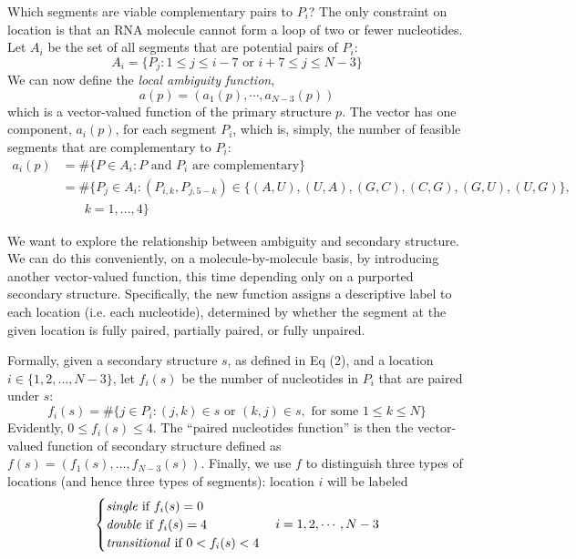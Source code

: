 \documentclass[10pt,letterpaper]{article}
\begin{document}
Which segments are viable complementary pairs to $P_i$? The only constraint on location is that an RNA molecule cannot form a loop of two or fewer nucleotides. Let $A_i$ be the set of all segments that are potential pairs of $P_i$:
\begin{equation}
A_i = \{P_j: 1 \leq j \leq i - 7 \text{ or }i + 7 \leq j \leq N - 3\}
\end{equation}
We can now define the {\em local ambiguity function}, 
\[
a(p) = (a_1(p), \cdots, a_{N - 3}(p))
\]
which is a vector-valued function of the primary structure $p$. The vector has  one component, $a_i(p)$, for each segment $P_i$, which is, simply, the number of feasible segments that are complementary to $P_i$:
\begin{align}
 a_i (p)& =  \# \{ P \in A_i : P \text{ and }P_i \text{ are complementary} \}  
 \label{eqn:LocalAmbiguity} \\
& = 
\#\big\{P_j\in A_i:  (P_{i, k}, P_{j, 5 - k}) \in \{ (A, U), (U, A), (G, C), (C, G), (G,U), (U,G) \},
\nonumber  \\
&  \ \ \ \ \ \ \ \ k=1,\ldots,4 \big\} 
\nonumber 
\end{align}

We want to explore the relationship between ambiguity and secondary structure. 
We can do this conveniently, on a molecule-by-molecule basis, by introducing another vector-valued function, this time depending only on a purported secondary structure.  Specifically, the new function assigns a descriptive label to each location (i.e. each nucleotide), determined by whether the segment at the given location is fully paired, partially paired, or fully unpaired. 

Formally, given a secondary structure $s$, as defined in Eq (2), and a location $i\in\{1, 2,\ldots,N-3\}$, let $f_i(s)$ be the number of nucleotides in $P_i$ that are paired under $s$:
\begin{equation}
f_i(s) = \#\{j\in P_i:(j,k)\in s\text{ or } (k,j)\in s, \text{ for some } 1\leq k \leq N\}
\end{equation}
Evidently, $0\leq f_i(s)\leq 4$. The ``paired nucleotides function'' is then the 
vector-valued function of secondary structure defined as 
$f(s)=(f_1(s),\ldots,f_{N-3}(s))$.
Finally, we use $f$ to distinguish three types of locations (and hence three types of segments): location $i$ will be labeled 
\begin{equation}
	\begin{cases}
		\text{\textit{single} if } f_i(s) = 0 \\
		\text{\textit{double} if } f_i(s) = 4 \\
		\text{\textit{transitional} if } 0 < f_i(s) < 4
	\end{cases} i = 1, 2, \cdots, N - 3
\end{equation}
\end{document}
